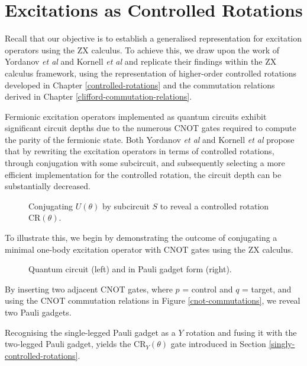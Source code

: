 \section{Excitations as Controlled Rotations}%
\label{operator-controlled-rotations}

Recall that our objective is to establish a generalised representation for excitation operators using the ZX calculus. To achieve this, we draw upon the work of Yordanov \textit{et al} \cite{Yordanov2020} and Kornell \textit{et al} \cite{Kornell2023} and replicate their findings within the ZX calculus framework, using the representation of higher-order controlled rotations developed in Chapter \ref{controlled-rotations} and the commutation relations derived in Chapter \ref{clifford-commutation-relations}. 

Fermionic excitation operators implemented as quantum circuits exhibit significant circuit depths due to the numerous CNOT gates required to compute the parity of the fermionic state. Both Yordanov \textit{et al} and Kornell \textit{et al} propose that by rewriting the excitation operators in terms of controlled rotations, through conjugation with some subcircuit, and subsequently selecting a more efficient implementation for the controlled rotation, the circuit depth can be substantially decreased.

\begin{figure}[H]
    \centering
    \caption{Conjugating $U(\theta)$ by subcircuit $S$ to reveal a controlled rotation CR$(\theta)$.}
\end{figure}

To illustrate this, we begin by demonstrating the outcome of conjugating a minimal one-body excitation operator with CNOT gates using the ZX calculus.

\begin{figure}[H]
    \centering
    \caption{Quantum circuit (left) and in Pauli gadget form (right).}
    \label{minimal-one-body}
\end{figure}

By inserting two adjacent CNOT gates, where $p$ = control and $q$ = target, and using the CNOT commutation relations in Figure \ref{cnot-commutations}, we reveal two Pauli gadgets.


Recognising the single-legged Pauli gadget as a $Y$ rotation and fusing it with the two-legged Pauli gadget, yields the CR$_Y(\theta)$ gate introduced in Section \ref{singly-controlled-rotations}.

